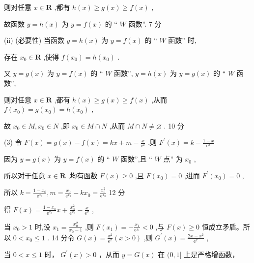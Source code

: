 \documentclass[10pt]{article}
\begin{document}
则对任意 \(x \in  \mathbf{R}\) ,都有 \(h\left( x\right)  \geq  g\left( x\right)  \geq  f\left( x\right)\) ,

故函数 \(y = h\left( x\right)\) 为 \(y = f\left( x\right)\) 的 “ \(W\) 函数”. 7 分

(ii) (必要性) 当函数 \(y = h\left( x\right)\) 为 \(y = f\left( x\right)\) 的 “ \(W\) 函数” 时,

存在 \({x}_{0} \in  \mathbf{R}\) ,使得 \(f\left( {x}_{0}\right)  = h\left( {x}_{0}\right)\) .

又 \(y = g\left( x\right)\) 为 \(y = f\left( x\right)\) 的 “ \(W\) 函数”, \(y = h\left( x\right)\) 为 \(y = g\left( x\right)\) 的 “ \(W\) 函数”,

则对任意 \(x \in  \mathbf{R}\) ,都有 \(h\left( x\right)  \geq  g\left( x\right)  \geq  f\left( x\right)\) ,从而 \(f\left( {x}_{0}\right)  = g\left( {x}_{0}\right)  = h\left( {x}_{0}\right)\) ,

故 \({x}_{0} \in  M,{x}_{0} \in  N\) ,即 \({x}_{0} \in  M \cap  N\) ,从而 \(M \cap  N \neq  \varnothing\) . 10 分

(3) 令 \(F\left( x\right)  = g\left( x\right)  - f\left( x\right)  = {kx} + m - \frac{x}{{\mathrm{e}}^{x}}\) ,则 \({F}^{\prime }\left( x\right)  = k - \frac{1 - x}{{\mathrm{e}}^{x}}\)

因为 \(y = g\left( x\right)\) 为 \(y = f\left( x\right)\) 的 “ \(W\) 函数”,且 “ \(W\) 点” 为 \({x}_{0}\) ,

所以对于任意 \(x \in  \mathbf{R}\) ,均有函数 \(F\left( x\right)  \geq  0\) ,且 \(F\left( {x}_{0}\right)  = 0\) ,进而 \({F}^{\prime }\left( {x}_{0}\right)  = 0\) ,

所以 \(k = \frac{1 - {x}_{0}}{{\mathrm{e}}^{{x}_{0}}},m = \frac{{x}_{0}}{{\mathrm{e}}^{{x}_{0}}} - k{x}_{0} = \frac{{x}_{0}^{2}}{{\mathrm{e}}^{{x}_{0}}}\) 12 分

得 \(F\left( x\right)  = \frac{1 - {x}_{0}}{{\mathrm{e}}^{{x}_{0}}}x + \frac{{x}_{0}^{2}}{{\mathrm{e}}^{{x}_{0}}} - \frac{x}{{\mathrm{e}}^{x}}\) ,

当 \({x}_{0} > 1\) 时,设 \({x}_{1} = \frac{{x}_{0}^{2}}{{x}_{0} - 1}\) ,则 \(F\left( {x}_{1}\right)  =  - \frac{{x}_{1}}{{\mathrm{e}}^{{x}_{1}}} < 0\) ,与 \(F\left( x\right)  \geq  0\) 恒成立矛盾。所以 \(0 < {x}_{0} \leq  1\) . 14 分令 \(G\left( x\right)  = \frac{{x}^{2}}{{\mathrm{e}}^{x}}\left( {x > 0}\right)\) ,则 \({G}^{\prime }\left( x\right)  = \frac{{2x} - {x}^{2}}{{\mathrm{e}}^{x}}\) ,

当 \(0 < x \leq  1\) 时， \({G}^{\prime }\left( x\right)  > 0\) ，从而 \(y = G\left( x\right)\) 在 \((0,1\rbrack\) 上是严格增函数，
\end{document}

